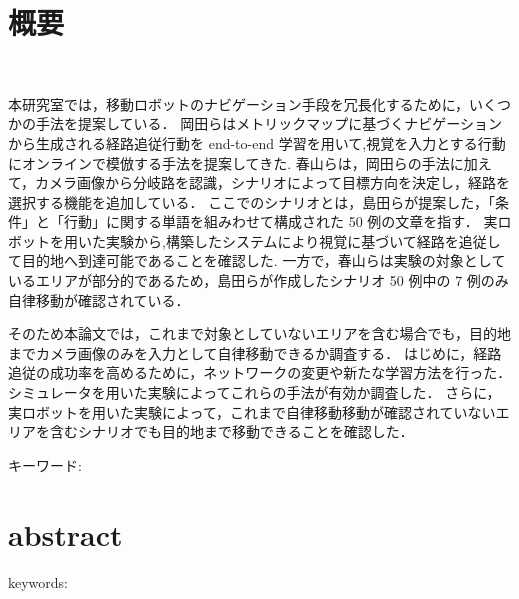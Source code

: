 \chapter*{概要}
\thispagestyle{empty}
%
\begin{center}
  \scalebox{1.5}{タイトル}\\
\end{center}
\vspace{1.0zh}

本研究室では，移動ロボットのナビゲーション手段を冗長化するために，いくつかの手法を提案している．
岡田らはメトリックマップに基づくナビゲーションから生成される経路追従行動を end-to-end 学習を用いて,視覚を入力とする行動にオンラインで模倣する手法を提案してきた.
春山らは，岡田らの手法に加えて，カメラ画像から分岐路を認識，シナリオによって目標方向を決定し，経路を選択する機能を追加している．
ここでのシナリオとは，島田らが提案した，「条件」と「行動」に関する単語を組みわせて構成された 50 例の文章を指す．
実ロボットを用いた実験から,構築したシステムにより視覚に基づいて経路を追従して目的地へ到達可能であることを確認した.
一方で，春山らは実験の対象としているエリアが部分的であるため，島田らが作成したシナリオ 50 例中の 7 例のみ自律移動が確認されている．

そのため本論文では，これまで対象としていないエリアを含む場合でも，目的地までカメラ画像のみを入力として自律移動できるか調査する．
はじめに，経路追従の成功率を高めるために，ネットワークの変更や新たな学習方法を行った．
シミュレータを用いた実験によってこれらの手法が有効か調査した．
さらに，実ロボットを用いた実験によって，これまで自律移動移動が確認されていないエリアを含むシナリオでも目的地まで移動できることを確認した．

キーワード: 
%
\newpage
\chapter*{abstract}
\thispagestyle{empty}
%
\begin{center}
  \scalebox{1.3}{title}
\end{center}
\vspace{1.0zh}
%


keywords: 
